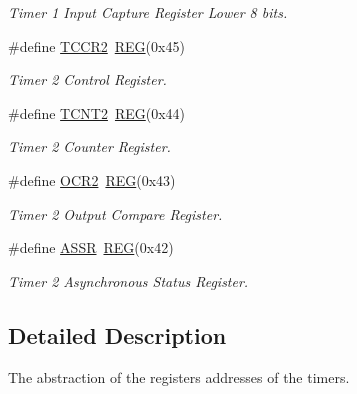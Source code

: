 \begin{DoxyCompactItemize}
\begin{DoxyCompactList}\small\item\em Timer 1 Input Capture Register Lower 8 bits. \end{DoxyCompactList}\item 
\hypertarget{group__TIMERMCAL_gae0274f99f343c0c5636d7ca10d56a5d5}{\#define \hyperlink{group__TIMERMCAL_gae0274f99f343c0c5636d7ca10d56a5d5}{T\+C\+C\+R2}~\hyperlink{group__MCAL_ga72e45020e46f285689db51c46f273403}{R\+E\+G}(0x45)}\label{group__TIMERMCAL_gae0274f99f343c0c5636d7ca10d56a5d5}

\begin{DoxyCompactList}\small\item\em Timer 2 Control Register. \end{DoxyCompactList}\item 
\hypertarget{group__TIMERMCAL_ga12a808b752aa26d0256e9002fac53e72}{\#define \hyperlink{group__TIMERMCAL_ga12a808b752aa26d0256e9002fac53e72}{T\+C\+N\+T2}~\hyperlink{group__MCAL_ga72e45020e46f285689db51c46f273403}{R\+E\+G}(0x44)}\label{group__TIMERMCAL_ga12a808b752aa26d0256e9002fac53e72}

\begin{DoxyCompactList}\small\item\em Timer 2 Counter Register. \end{DoxyCompactList}\item 
\hypertarget{group__TIMERMCAL_gaa8fa9a2385a2bd96717ab4cc7bc10472}{\#define \hyperlink{group__TIMERMCAL_gaa8fa9a2385a2bd96717ab4cc7bc10472}{O\+C\+R2}~\hyperlink{group__MCAL_ga72e45020e46f285689db51c46f273403}{R\+E\+G}(0x43)}\label{group__TIMERMCAL_gaa8fa9a2385a2bd96717ab4cc7bc10472}

\begin{DoxyCompactList}\small\item\em Timer 2 Output Compare Register. \end{DoxyCompactList}\item 
\hypertarget{group__TIMERMCAL_ga7f30b79723a0680c4cab087964d2ea55}{\#define \hyperlink{group__TIMERMCAL_ga7f30b79723a0680c4cab087964d2ea55}{A\+S\+S\+R}~\hyperlink{group__MCAL_ga72e45020e46f285689db51c46f273403}{R\+E\+G}(0x42)}\label{group__TIMERMCAL_ga7f30b79723a0680c4cab087964d2ea55}

\begin{DoxyCompactList}\small\item\em Timer 2 Asynchronous Status Register. \end{DoxyCompactList}\end{DoxyCompactItemize}


\subsection{Detailed Description}
The abstraction of the registers addresses of the timers. 

